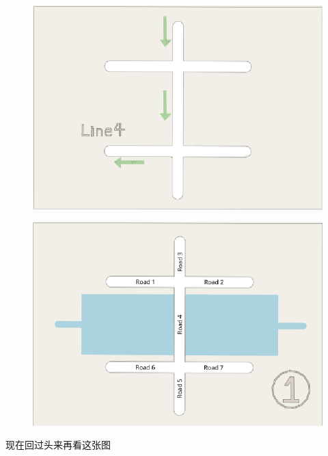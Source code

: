 \documentclass{beamer}
\begin{document}
\begin{frame}
	\begin{figure}[htpb]
		\centering
		\includegraphics[width=1\linewidth]{figure/line4.png}
	\end{figure}
\end{frame}

\begin{frame}
	\begin{figure}[htpb]
		\centering
		\includegraphics[width=0.95\linewidth]{figure/plot1.png}
	\end{figure}
	{
		\centering
		\quad \quad \quad \quad 现在回过头来再看这张图
	}
\end{frame}
\end{document}
